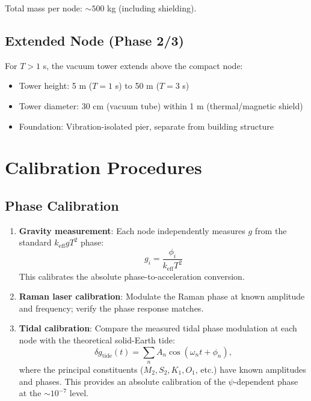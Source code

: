 \documentclass[12pt,a4paper]{article}
\begin{document}
Total mass per node: $\sim 500$ kg (including shielding).

\subsection{Extended Node (Phase 2/3)}

For $T > 1$ s, the vacuum tower extends above the compact node:
\begin{itemize}
\item Tower height: 5 m ($T = 1$ s) to 50 m ($T = 3$ s)
\item Tower diameter: 30 cm (vacuum tube) within 1 m (thermal/magnetic
shield)
\item Foundation: Vibration-isolated pier, separate from building structure
\end{itemize}


\section{Calibration Procedures}\label{sec:calibration}

\subsection{Phase Calibration}

\begin{enumerate}
\item \textbf{Gravity measurement}: Each node independently measures
$g$ from the standard $k_{\text{eff}}gT^2$ phase:
\begin{equation}
g_i = \frac{\phi_i}{k_{\text{eff}}T^2}
\end{equation}
This calibrates the absolute phase-to-acceleration conversion.

\item \textbf{Raman laser calibration}: Modulate the Raman phase at
known amplitude and frequency; verify the phase response matches.

\item \textbf{Tidal calibration}: Compare the measured tidal phase
modulation at each node with the theoretical solid-Earth tide:
\begin{equation}
\delta g_{\text{tide}}(t) = \sum_{n} A_n \cos(\omega_n t + \phi_n),
\end{equation}
where the principal constituents ($M_2, S_2, K_1, O_1$, etc.) have
known amplitudes and phases. This provides an absolute calibration of
the $\psi$-dependent phase at the $\sim 10^{-7}$ level.
\end{enumerate}
\end{document}
